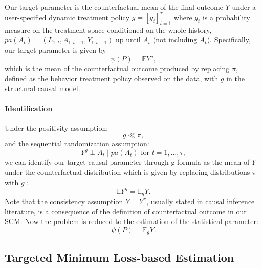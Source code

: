 \documentclass{article}
\theoremstyle{plain}
\theoremstyle{definition}
\theoremstyle{remark}
\newcommand{\EE}[0]{\mathbb{E}}
\begin{document}
Our target parameter is the counterfactual mean of the final outcome $Y$ under a user-specified dynamic treatment policy $g=[g_t]_{t=1}^\tau$ where $g_t$ is a probability measure on the treatment space conditioned on the whole history, $pa(A_t) = (L_{1:t},A_{1:t-1},Y_{1:t-1})$ up until $A_t$ (not including $A_t$). Specifically, our target parameter is given by
\begin{equation}
    \psi(P) = \EE Y^g,
\end{equation}
which is the mean of the counterfactual outcome produced by replacing $\pi$, defined as the behavior treatment policy observed on the data, with $g$ in the structural causal model. 

\paragraph{Identification} Under the positivity assumption: 
\begin{equation}
    g \ll \pi,    
\end{equation}
and the sequential randomization assumption:
\begin{equation}
    Y^g \perp A_t \mid pa(A_t) \text{ for } t=1,\ldots,\tau,    
\end{equation}
we can identify our target causal parameter through g-formula as the mean of $Y$ under the counterfactual distribution which is given by replacing distributions $\pi$ with $g$ \cite{robins1986new}:
\begin{equation}
    \EE Y^g = \EE_gY.
\end{equation}
Note that the consistency assumption $Y=Y^{\pi}$, usually stated in causal inference literature, is a consequence of the definition of counterfactual outcome in our SCM. Now the problem is reduced to the estimation of the statistical parameter:
\begin{equation}
    \label{eq:g-functional}
    \psi(P) = \EE_gY.
\end{equation}

\subsection{Targeted Minimum Loss-based Estimation}

\label{sec:plug-in}
\end{document}

